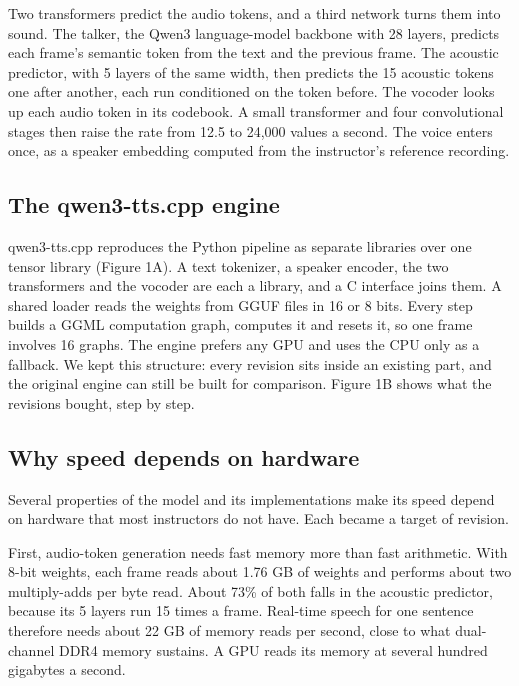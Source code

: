\documentclass[11pt]{article}
\begin{document}
Two transformers predict the audio tokens, and a third network turns
them into sound. The talker, the Qwen3 language-model backbone with 28
layers, predicts each frame's semantic token from the text and the
previous frame. The acoustic predictor, with 5 layers of the same width,
then predicts the 15 acoustic tokens one after another, each run
conditioned on the token before. The vocoder looks up each audio token
in its codebook. A small transformer and four convolutional stages then
raise the rate from 12.5 to 24,000 values a second. The voice enters
once, as a speaker embedding computed from the instructor's reference
recording.

\hypertarget{the-qwen3-tts.cpp-engine}{%
\subsection{The qwen3-tts.cpp engine}\label{the-qwen3-tts.cpp-engine}}

qwen3-tts.cpp reproduces the Python pipeline as separate libraries over
one tensor library (Figure 1A). A text tokenizer, a speaker encoder, the
two transformers and the vocoder are each a library, and a C interface
joins them. A shared loader reads the weights from GGUF files in 16 or 8
bits. Every step builds a GGML computation graph, computes it and resets
it, so one frame involves 16 graphs. The engine prefers any GPU and uses
the CPU only as a fallback. We kept this structure: every revision sits
inside an existing part, and the original engine can still be built for
comparison. Figure 1B shows what the revisions bought, step by step.

\hypertarget{why-speed-depends-on-hardware}{%
\subsection{Why speed depends on
hardware}\label{why-speed-depends-on-hardware}}

Several properties of the model and its implementations make its speed
depend on hardware that most instructors do not have. Each became a
target of revision.

First, audio-token generation needs fast memory more than fast
arithmetic. With 8-bit weights, each frame reads about 1.76 GB of
weights and performs about two multiply-adds per byte read. About 73\%
of both falls in the acoustic predictor, because its 5 layers run 15
times a frame. Real-time speech for one sentence therefore needs about
22 GB of memory reads per second, close to what dual-channel DDR4 memory
sustains. A GPU reads its memory at several hundred gigabytes a second.
\end{document}
